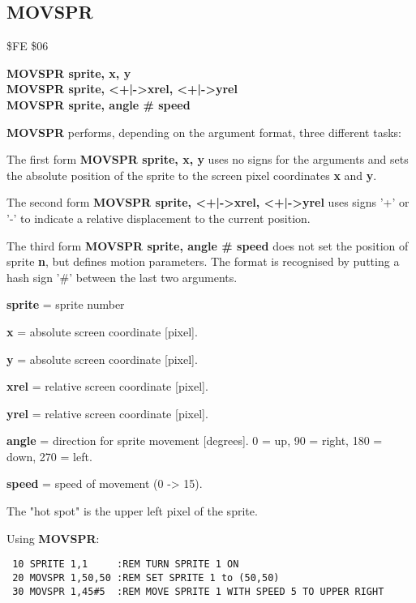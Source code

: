 \subsection{MOVSPR}
\begin{description}[leftmargin=2cm,style=nextline]
\item [Token:] \$FE \$06
\item [Format:] {\bf MOVSPR sprite, x, y} \\
                {\bf MOVSPR sprite, <+|->xrel, <+|->yrel} \\
                {\bf MOVSPR sprite, angle \# speed}
\item [Usage:]  {\bf MOVSPR} performs, depending on the argument
                format, three different tasks:

                The first form {\bf MOVSPR sprite, x, y} uses no
                signs for the arguments and sets the absolute
                position of the sprite to the screen pixel
                coordinates {\bf x} and {\bf y}.

                The second form {\bf MOVSPR sprite, <+|->xrel, <+|->yrel}
                uses signs '+' or '-' to indicate a relative
                displacement to the current position.

                The third form {\bf MOVSPR sprite, angle \# speed} does not
                set the position of sprite {\bf n}, but defines
                motion parameters. The format is recognised by putting
                a hash sign '\#' between the last two arguments.

                {\bf sprite} = sprite number

                {\bf x} = absolute screen coordinate [pixel].

                {\bf y} = absolute screen coordinate [pixel].

                {\bf xrel} = relative screen coordinate [pixel].

                {\bf yrel} = relative screen coordinate [pixel].

                {\bf angle} = direction for sprite movement [degrees].
                0 = up, 90 = right, 180 = down, 270 = left.

                {\bf speed} = speed of movement (0 -> 15).

\item [Remarks:] The "hot spot" is the upper left pixel of the sprite.

\item [Example:] Using {\bf MOVSPR}:
\begin{tcolorbox}[colback=black,coltext=white]
\verbatimfont{\codefont}
\begin{verbatim}
 10 SPRITE 1,1     :REM TURN SPRITE 1 ON
 20 MOVSPR 1,50,50 :REM SET SPRITE 1 to (50,50)
 30 MOVSPR 1,45#5  :REM MOVE SPRITE 1 WITH SPEED 5 TO UPPER RIGHT
\end{verbatim}
\end{tcolorbox}
\end{description}

